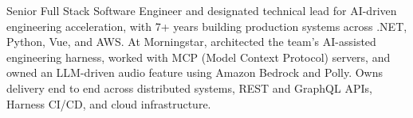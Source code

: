 ﻿

\begin{cvparagraph}
Senior Full Stack Software Engineer and designated technical lead for AI-driven engineering acceleration, with 7+ years building production systems across .NET, Python, Vue, and AWS. At Morningstar, architected the team's AI-assisted engineering harness, worked with MCP (Model Context Protocol) servers, and owned an LLM-driven audio feature using Amazon Bedrock and Polly. Owns delivery end to end across distributed systems, REST and GraphQL APIs, Harness CI/CD, and cloud infrastructure.
\end{cvparagraph}
